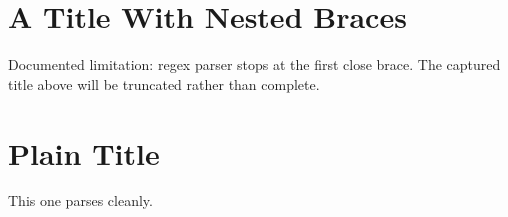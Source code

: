 \section{A Title With {Nested} Braces}
Documented limitation: regex parser stops at the first close brace.
The captured title above will be truncated rather than complete.

\section{Plain Title}
This one parses cleanly.
